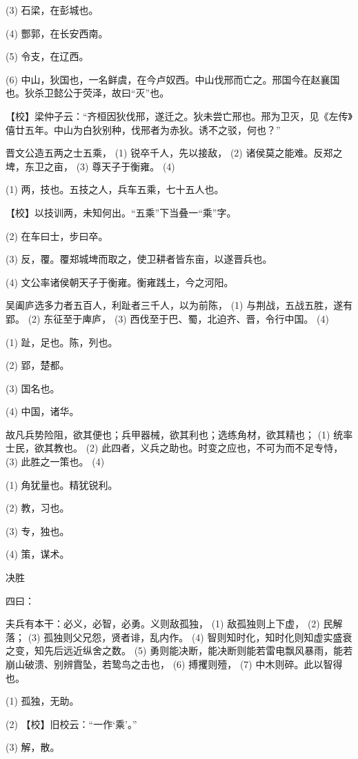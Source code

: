 \documentclass[12pt,UTF8]{ctexbook}
\begin{document}
(3) 石梁，在彭城也。

(4) 酆郭，在长安西南。

(5) 令支，在辽西。

(6) 中山，狄国也，一名鲜虞，在今卢奴西。中山伐邢而亡之。邢国今在赵襄国也。狄杀卫懿公于荧泽，故曰“灭”也。

【校】梁仲子云：“齐桓因狄伐邢，遂迁之。狄未尝亡邢也。邢为卫灭，见《左传》僖廿五年。中山为白狄别种，伐邢者为赤狄。诱不之驳，何也？”

晋文公造五两之士五乘， (1) 锐卒千人，先以接敌， (2) 诸侯莫之能难。反郑之埤，东卫之亩， (3) 尊天子于衡雍。 (4)

(1) 两，技也。五技之人，兵车五乘，七十五人也。

【校】以技训两，未知何出。“五乘”下当叠一“乘”字。

(2) 在车曰士，步曰卒。

(3) 反，覆。覆郑城埤而取之，使卫耕者皆东亩，以遂晋兵也。

(4) 文公率诸侯朝天子于衡雍。衡雍践土，今之河阳。

吴阖庐选多力者五百人，利趾者三千人，以为前陈， (1) 与荆战，五战五胜，遂有郢。 (2) 东征至于庳庐， (3) 西伐至于巴、蜀，北迫齐、晋，令行中国。 (4)

(1) 趾，足也。陈，列也。

(2) 郢，楚都。

(3) 国名也。

(4) 中国，诸华。

故凡兵势险阻，欲其便也；兵甲器械，欲其利也；选练角材，欲其精也； (1) 统率士民，欲其教也。 (2) 此四者，义兵之助也。时变之应也，不可为而不足专恃， (3) 此胜之一策也。 (4)

(1) 角犹量也。精犹锐利。

(2) 教，习也。

(3) 专，独也。

(4) 策，谋术。





决胜


四曰：

夫兵有本干：必义，必智，必勇。义则敌孤独， (1) 敌孤独则上下虚， (2) 民解落； (3) 孤独则父兄怨，贤者诽，乱内作。 (4) 智则知时化，知时化则知虚实盛衰之变，知先后远近纵舍之数。 (5) 勇则能决断，能决断则能若雷电飘风暴雨，能若崩山破溃、别辨霣坠，若鸷鸟之击也， (6) 搏攫则殪， (7) 中木则碎。此以智得也。

(1) 孤独，无助。

(2) 【校】旧校云：“一作‘乘’。”

(3) 解，散。
\end{document}
